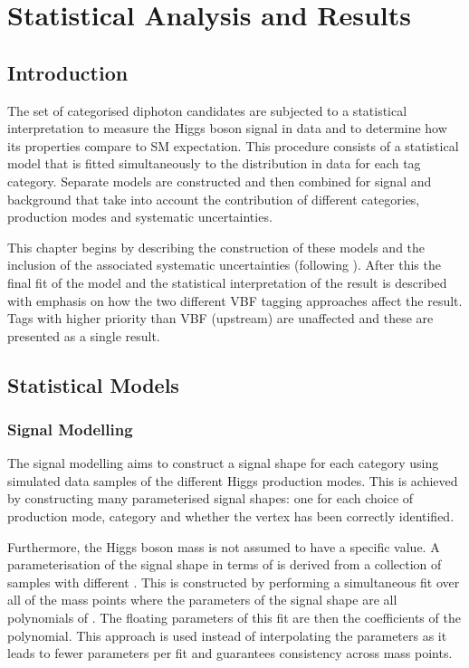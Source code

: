 
\chapter{Statistical Analysis and Results}
\label{chap:statistical}


\section{Introduction}
The set of categorised diphoton candidates are subjected to a statistical interpretation to measure the Higgs boson signal in data and to determine how its properties compare to SM expectation.
This procedure consists of a statistical model that is fitted simultaneously to the \mgg distribution in data for each tag category. 
Separate models are constructed and then combined for signal and background that take into account the contribution of different categories, production modes and systematic uncertainties.

This chapter begins by describing the construction of these models and the inclusion of the associated systematic uncertainties (following \cite{HIG-16-040}). 
After this the final fit of the model and the statistical interpretation of the result is described with emphasis on how the two different VBF tagging approaches affect the result. 
Tags with higher priority than VBF (upstream) are unaffected and these are presented as a single result. 


\section{Statistical Models}
\subsection{Signal Modelling}
The signal modelling aims to construct a signal shape for each category using simulated data samples of the different Higgs production modes.
This is achieved by constructing many parameterised signal shapes: one for each choice of production mode, category and whether the vertex has been correctly identified. 

Furthermore, the Higgs boson mass \mH is not assumed to have a specific value. A parameterisation of the signal shape in terms of \mH is derived from a collection of samples with different \mH.
This is constructed by performing a simultaneous fit over all of the mass points where the parameters of the signal shape are all polynomials of \mH. 
The floating parameters of this fit are then the coefficients of the polynomial. 
This approach is used instead of interpolating the parameters as it leads to fewer parameters per fit and guarantees consistency across mass points. 

